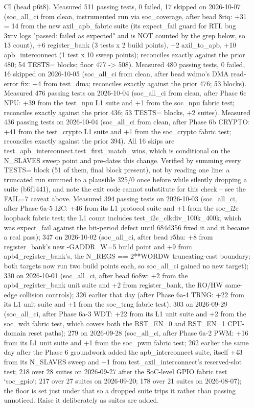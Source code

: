 \begin{record}
\begin{textblock}
CI (bead p6t8). Measured 511 passing tests, 0 failed, 17 skipped on
2026-10-07 (soc_all_ci from clean, instrumented run via soc_coverage, after bead 8riq:
+31 = 14 from the new axil_apb_fabric suite (its expect_fail guard for RTL bug 3xtv
logs "passed: failed as expected" and is NOT counted by the grep below, so 13 count),
+6 register_bank (3 tests x 2 build points), +2 axil_to_apb, +10 apb_interconnect
(1 test x 10 sweep points); reconciles exactly against the prior 480; 54 TESTS= blocks;
floor 477 -> 508).
Measured 480 passing tests, 0 failed, 16 skipped on
2026-10-05 (soc_all_ci from clean, after bead wdmo's DMA read-error fix:
+4 from test_dma; reconciles exactly against the prior 476; 53 blocks).
Measured 476 passing tests on 2026-10-04 (soc_all_ci from clean, after Phase 6c NPU: +39 from the
test_npu L1 suite and +1 from the soc_npu fabric test; reconciles
exactly against the prior 436; 53 TESTS= blocks, +2 suites). Measured
436 passing tests on 2026-10-04 (soc_all_ci from clean, after Phase 6b CRYPTO: +41 from the
test_crypto L1 suite and +1 from the soc_crypto fabric test; reconciles
exactly against the prior 394). All 16 skips are
test_apb_interconnect.test_first_match_wins, which is conditional on the
N_SLAVES sweep point and pre-dates this change. Verified by summing every
TESTS= block (51 of them, final block present), not by reading one line:
a truncated run summed to a plausible 325/0 once before while silently
dropping a suite (b6f1441), and note the exit code cannot substitute for
this check -- see the FAIL=7 caveat above. Measured 394 passing tests on
2026-10-03 (soc_all_ci, after Phase 6a-5 I2C: +46 from its L1 protocol
suite and +1 from the soc_i2c loopback fabric test; the L1 count includes
test_i2c_clkdiv_100k_400k, which was expect_fail against the bit-period
defect until 684d356 fixed it and it became a real pass); 347 on
2026-10-02 (soc_all_ci, after bead r5hu: +8 from register_bank's new
-GADDR_W=5 build point and +9 from apb4_register_bank's, the
N_REGS == 2**WORDW truncating-cast boundary; both targets now run two
build points each, so soc_all_ci gained no new target); 330 on
2026-10-01 (soc_all_ci, after bead 6o8w: +2 from the apb4_register_bank
unit suite and +2 from register_bank, the RO/HW same-edge collision
controls); 326 earlier that day
(after Phase 6a-4 TRNG: +22 from its L1 unit
suite and +1 from the soc_trng fabric test); 303 on
2026-09-29 (soc_all_ci, after Phase 6a-3 WDT: +22 from its L1 unit suite
and +2 from the soc_wdt fabric test, which covers both the RST_EN=0 and
RST_EN=1 CPU-domain reset paths); 279 on
2026-09-28 (soc_all_ci, after Phase 6a-2 PWM: +16 from its L1 unit suite
and +1 from the soc_pwm fabric test; 262 earlier the same day after the
Phase 6 groundwork added the apb_interconnect suite, itself +43 from its
N_SLAVES sweep and +1 from test_axil_interconnect's reserved-slot test;
218 over 28 suites on
2026-09-27 after the SoC-level GPIO fabric test `soc_gpio`; 217 over 27
suites on 2026-09-20; 178 over 21 suites on 2026-08-07); the floor is
set just under that so a dropped suite trips it rather than passing
unnoticed. Raise it deliberately as suites are added.
\end{textblock}


\end{record}
